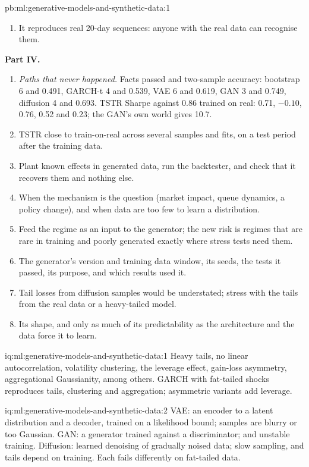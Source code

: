 \begin{solution}{pb:ml:generative-models-and-synthetic-data:1}
\begin{enumerate}[resume]
predictability without artefacts: none of the networks here is good enough, and the bootstrap's copies add little new.
\item It reproduces real 20-day sequences: anyone with the real data can recognise them.
\end{enumerate}
\textbf{Part IV.}
\begin{enumerate}[resume]
\item \emph{Paths that never happened.} Facts passed and two-sample accuracy: bootstrap 6 and 0.491, GARCH-t 4 and 0.539,
VAE 6 and 0.619, GAN 3 and 0.749, diffusion 4 and 0.693. TSTR Sharpe against 0.86 trained on real: 0.71, $-0.10$, 0.76,
0.52 and 0.23; the GAN's own world gives 10.7.
\item TSTR close to train-on-real across several samples and fits, on a test period after the training data.
\item Plant known effects in generated data, run the backtester, and check that it recovers them and nothing else.
\item When the mechanism is the question (market impact, queue dynamics, a policy change), and when data are too few to
learn a distribution.
\item Feed the regime as an input to the generator; the new risk is regimes that are rare in training and poorly generated
exactly where stress tests need them.
\item The generator's version and training data window, its seeds, the tests it passed, its purpose, and which results used
it.
\item Tail losses from diffusion samples would be understated; stress with the tails from the real data or a heavy-tailed
model.
\item Its shape, and only as much of its predictability as the architecture and the data force it to learn.
\end{enumerate}
\end{solution}

\begin{solution}{iq:ml:generative-models-and-synthetic-data:1}
Heavy tails, no linear autocorrelation, volatility clustering, the leverage effect, gain-loss asymmetry, aggregational
Gaussianity, among others. GARCH with fat-tailed shocks reproduces tails, clustering and aggregation; asymmetric variants
add leverage.
\end{solution}

\begin{solution}{iq:ml:generative-models-and-synthetic-data:2}
VAE: an encoder to a latent distribution and a decoder, trained on a likelihood bound; samples are blurry or too Gaussian.
GAN: a generator trained against a discriminator;  and unstable training. Diffusion: learned denoising of
gradually noised data; slow sampling, and tails depend on training. Each fails differently on fat-tailed data.
\end{solution}

